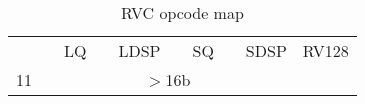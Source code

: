 \begin{table*}[htbp]
\begin{center}
{\begin{tabular}{|r|c|c|c|c|c|c|c|c|l}
                        &                           & LQ    &                       & LDSP                          &                                & SQ                 &                       & SDSP                  & RV128 \\ \cline{1-9}
    \cellcolor{gray} 11  & \multicolumn{8}{c|}{\cellcolor{gray} $>$16b} \\ \cline{1-9}
 \end{tabular}
}
\end{center}
\vspace{-0.15in}
\caption{RVC opcode map}
\label{rvcopcodemap}
\end{table*}
